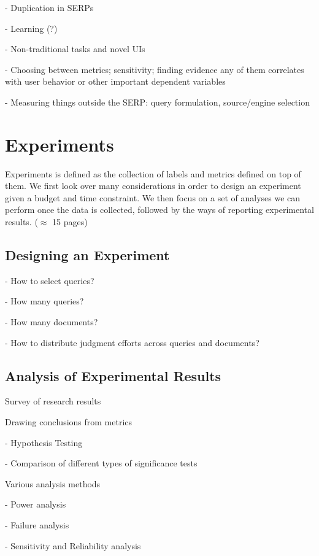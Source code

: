 \documentclass[openany]{now} %
\newcommand{\newpar}{\bigskip\noindent}
\begin{document}
- Duplication in SERPs

- Learning (?)

- Non-traditional tasks and novel UIs

- Choosing between metrics; sensitivity; finding evidence any of them correlates with user behavior or other important dependent variables

- Measuring things outside the SERP: query formulation, source/engine selection

\chapter{Experiments}
\label{c-experiment}

Experiments is defined as the collection of labels and metrics defined on top of them. We first look over many considerations in order to design an experiment given a budget and time constraint. We then focus on a set of analyses we can perform once the data is collected, followed by the ways of reporting experimental results. (\ensuremath{\approx} 15 pages)

\section{Designing an Experiment}

- How to select queries?

- How many queries? \cite{Sakai:2014}

- How many documents? \cite{CarterettePFK09}

- How to distribute judgment efforts across queries and documents? \cite{CarterettePKAA09, YilmazR09}


\section{Analysis of Experimental Results}

Survey of research results \cite{Sakai:2016}

Drawing conclusions from metrics 

- Hypothesis Testing \cite{Dincer:2014}

- Comparison of different types of significance tests \cite{SmuckerAC09}

\newpar
Various analysis methods

- Power analysis \cite{Sakai:2014}

- Failure analysis

- Sensitivity and Reliability analysis \cite{Urbano:2013} 
\end{document}

